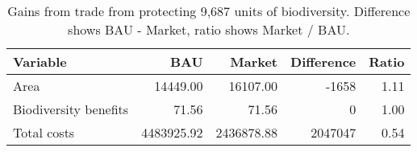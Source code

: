 \begin{table}

\caption{\label{tab:gains-from-trade}Gains from trade from protecting 9,687 units of biodiversity. Difference shows BAU - Market, ratio shows Market / BAU.}
\centering
\begin{tabular}[t]{l|r|r|r|r}
\hline
Variable & BAU & Market & Difference & Ratio\\
\hline
Area & 14449.00 & 16107.00 & -1658 & 1.11\\
\hline
Biodiversity benefits & 71.56 & 71.56 & 0 & 1.00\\
\hline
Total costs & 4483925.92 & 2436878.88 & 2047047 & 0.54\\
\hline
\end{tabular}
\end{table}